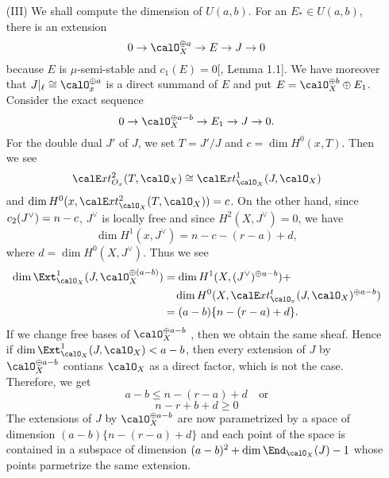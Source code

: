 \begin{itemize}
\item[(III)] We shall compute the dimension of $U(a,b)$. For an $E_{*} \in U(a, b)$, there is an extension
$$
0 \rightarrow \calO_{X}^{\oplus a} \rightarrow E \rightarrow J \rightarrow 0
$$
because $E$ is $\mu$-semi-stable and $c_{1}(E) =0$[\cite{art12-key6}, Lemma 1.1]. We have moreover that $ J|_{\ell}\cong \calO_{x}^{\oplus a}$ is a direct summand of $E$ and put $E=\calO_{X}^{\oplus b} \oplus E_{1}$. Consider the exact sequence
$$
0\rightarrow \calO_{X}^{\oplus a-b} \rightarrow E_{1} \rightarrow J \rightarrow 0.
$$
For the double dual $J'$ of $J$, we set $T= J'/J$ and $c =\dim H^{0}(x, T)$. Then we see
$$
\calE xt_{O_{x}}^{2} (T, \calO_{X})\cong  \calE xt_{\calO_{X}}^{1} (J, \calO_{X})
$$
and $\dim H^{0}(x, \calE xt_{\calO_{X}}^{2} (T, \calO_{X}))=c$. On the other hand, since $c_{2}(J^{\vee})\break =n-c$, $J^{\vee}$ is locally free and since $H^{2}(X, J^{\vee})=0$, we have
$$
\dim H^{1}(x, J^{\vee}) = n-c-(r-a) +d,
$$
where $d=\dim H^{0}(X, J^{\vee})$. Thus we see
\begin{equation*}
\begin{split}
\dim \Ext_{\calO_{X}}^{1}(J, \calO_{X}^{\oplus (a-b)})& = \dim H^{1}(X, (J^{\vee})^{\oplus a-b}) +\\
            &\quad \dim H^{0}(X, \calE xt_{\calO_{x}}^{t}(J, \calO_{X})^{\oplus a-b})\\
            &= (a-b) \{n-(r-a) + d \}.            
\end{split}
\end{equation*}
If we change free bases of $\calO_{X}^{\oplus a-b}$ , then we obtain the same sheaf. Hence if $\dim \Ext_{\calO_{X}}^{1} (J, \calO_{X}) < a-b$, then every extension of $J$ by $\calO_{X}^{\oplus a-b}$ contians $\calO_{X}$ as a direct factor, which is not the case. Therefore, we get
$$
a-b \leq n-(r-a)+d \quad \text{or}
$$
$$
n-r + b + d \geq 0
$$
The extensions of $J$ by $\calO_{X}^{\oplus a-b}$ are now parametrized by a space of dimension $(a-b)\{n-(r-a) + d\}$ and each point of the space is contained in a subspace of dimension $(a-b)^{2} + \dim \End_{\calO_{X}}(J)-1$ whose points parmetrize the same extension.


\end{itemize}
